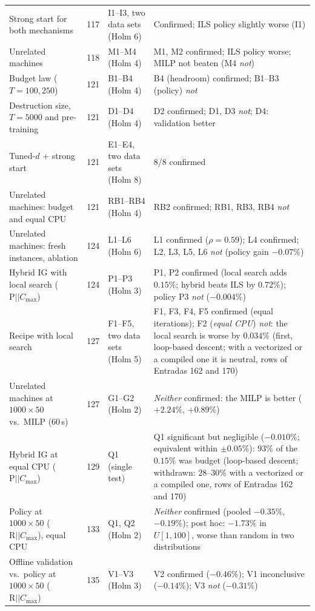 \begin{longtable}{@{}p{}p{}p{}p{}@{}}
Strong start for both mechanisms & 117 & I1--I3, two data sets (Holm 6) & Confirmed; ILS policy slightly worse (I1) \\
Unrelated machines & 118 & M1--M4 (Holm 4) & M1, M2 confirmed; ILS policy worse; MILP not beaten (M4 \emph{not}) \\
Budget law ($T=100,250$) & 121 & B1--B4 (Holm 4) & B4 (headroom) confirmed; B1--B3 (policy) \emph{not} \\
Destruction size, $T=5000$ and pre-training & 121 & D1--D4 (Holm 4) & D2 confirmed; D1, D3 \emph{not}; D4: validation better \\
Tuned-$d$ + strong start & 121 & E1--E4, two data sets (Holm 8) & 8/8 confirmed \\
Unrelated machines: budget and equal CPU & 121 & RB1--RB4 (Holm 4) & RB2 confirmed; RB1, RB3, RB4 \emph{not} \\
Unrelated machines: fresh instances, ablation & 124 & L1--L6 (Holm 6) & L1 confirmed ($\rho=0.59$); L4 confirmed; L2, L3, L5, L6 \emph{not} (policy gain $-0.07\%$) \\
Hybrid IG with local search ($\mathrm{P}||C_{\max}$) & 124 & P1--P3 (Holm 3) & P1, P2 confirmed (local search adds $0.15\%$; hybrid beats ILS by $0.72\%$); policy P3 \emph{not} ($-0.004\%$) \\
Recipe with local search & 127 & F1--F5, two data sets (Holm 5) & F1, F3, F4, F5 confirmed (equal iterations); F2 (\emph{equal CPU}) \emph{not}: the local search is worse by $0.034\%$ (first, loop-based descent; with a vectorized or a compiled one it is neutral, rows of Entradas 162 and 170) \\
Unrelated machines at $1000\times50$ vs.\ MILP (60\,s) & 127 & G1--G2 (Holm 2) & \emph{Neither} confirmed: the MILP is better ($+2.24\%$, $+0.89\%$) \\
Hybrid IG at equal CPU ($\mathrm{P}||C_{\max}$) & 129 & Q1 (single test) & Q1 significant but negligible ($-0.010\%$; equivalent within $\pm0.05\%$): $93\%$ of the $0.15\%$ was budget (loop-based descent; withdrawn: $28$--$30\%$ with a vectorized or a compiled one, rows of Entradas 162 and 170) \\
Policy at $1000\times50$ ($\mathrm{R}||C_{\max}$), equal CPU & 133 & Q1, Q2 (Holm 2) & \emph{Neither} confirmed (pooled $-0.35\%$, $-0.19\%$); post hoc: $-1.73\%$ in $U[1,100]$, worse than random in two distributions \\
Offline validation vs.\ policy at $1000\times50$ ($\mathrm{R}||C_{\max}$) & 135 & V1--V3 (Holm 3) & V2 confirmed ($-0.46\%$); V1 inconclusive ($-0.14\%$); V3 \emph{not} ($-0.31\%$) \\

\end{longtable}
